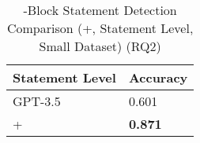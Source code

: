 




%


\begin{table}[htpb]
  \caption{-Block Statement Detection Comparison ({\xblock}+{\xstate}, Statement Level, Small Dataset) (RQ2)}
  \vspace{-12pt}
  \small
	\begin{center}
		\renewcommand{\arraystretch}{1}
		\begin{tabular}{| p{3.05cm}<{\centering} | p{1.2cm}<{\centering}|}
		  \hline
		Statement Level	  & Accuracy \\
			\hline
                        GPT-3.5 & 0.601  \\
			\hline
			\xblock + \xstate   & \textbf{0.871} \\
			\hline
		\end{tabular}
		\label{tab:xstate-3}
	\end{center}
\end{table}



